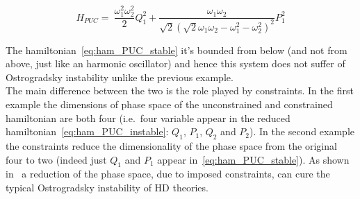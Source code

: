 \begin{equation} \label{eq:ham_PUC_stable}
  H_{PUC} =\ \frac{\omega_1^2\omega_2^2}{2} Q_1^2 +
  \frac{\omega_1\omega_2}{\sqrt{2} {\left(\sqrt{2} \omega_1\omega_2 -
  \omega_1^2 - \omega_2^2 \right)}^2} P_1^2
\end{equation}

The hamiltonian~\eqref{eq:ham_PUC_stable} it's bounded from below (and not from
above, just like an harmonic oscillator) and hence this system does not suffer
of Ostrogradsky instability unlike the previous example. \\

The main difference between the two is the role played by constraints. In the
first example the dimensions of phase space of the unconstrained and constrained
hamiltonian are both four (i.e.\ four variable appear in the reduced
hamiltonian~\eqref{eq:ham_PUC_instable}: $Q_1$, $P_1$, $Q_2$ and $P_2$). In the
second example the constraints reduce the dimensionality of the phase space from
the original four to two (indeed just $Q_1$ and $P_1$ appear
in~\eqref{eq:ham_PUC_stable}). As shown in~\cite{Chen13} a reduction of the
phase space, due to imposed constraints, can cure the typical Ostrogradsky
instability of HD theories.

